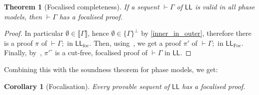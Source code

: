 \documentclass[11pt]{article}
\newtheorem{theorem}{Theorem}
\newtheorem{corollary}{Corollary}[theorem]
\newcommand\LL{\textsf{LL}}
\newcommand\LLfoc{{\LL_\text{foc}}}
\newcommand\LLFoc{{\LL_\text{Foc}}}
\newcommand\sem[1]{{\llbracket #1 \rrbracket}}
\begin{document}
\begin{theorem}[Focalised completeness]
    If a sequent $\vdash \Gamma$ of $\LL$ is valid in all phase models, then $\vdash \Gamma$ has a focalised proof.
\end{theorem}
\begin{proof}
    In particular $\emptyset \in \sem{\Gamma}$, hence $\emptyset \in \{\Gamma\}^\perp$ by
    \cref{inner_in_outer}, therefore there is a proof $\pi$ of $\vdash \Gamma;$ in $\LLfoc$.
    Then, using~\cite[section 3.2]{laurent}, we get a proof $\pi'$ of $\vdash \Gamma;$ in $\LLFoc$.
    Finally, by~\cite[proposition 2]{laurent}, $\pi'^\circ$ is a cut-free, focalised proof of $\vdash \Gamma$ in $\LL$.
\end{proof}

Combining this with the soundness theorem for phase models, we get:
\begin{corollary}[Focalisation]
    Every provable sequent of $\LL$ has a focalised proof.
\end{corollary}

\printbibliography
\end{document}
